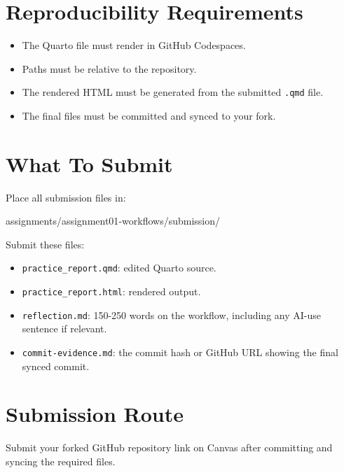 \documentclass[
  letterpaper,
  DIV=11,
  numbers=noendperiod,
  oneside]{scrreprt}
\newenvironment{Shaded}{\begin{snugshade}}{\end{snugshade}}
\newcommand{\NormalTok}[1]{\textcolor[rgb]{0.00,0.23,0.31}{#1}}
\providecommand{\tightlist}{%
  \setlength{\itemsep}{0pt}\setlength{\parskip}{0pt}}
\begin{document}
\section{Reproducibility
Requirements}\label{reproducibility-requirements}

\begin{itemize}
\tightlist
\item
  The Quarto file must render in GitHub Codespaces.
\item
  Paths must be relative to the repository.
\item
  The rendered HTML must be generated from the submitted \texttt{.qmd}
  file.
\item
  The final files must be committed and synced to your fork.
\end{itemize}

\section{What To Submit}\label{what-to-submit}

Place all submission files in:

\begin{Shaded}
\begin{Highlighting}[numbers=left,,]
\NormalTok{assignments/assignment01{-}workflows/submission/}
\end{Highlighting}
\end{Shaded}

Submit these files:

\begin{itemize}
\tightlist
\item
  \texttt{practice\_report.qmd}: edited Quarto source.
\item
  \texttt{practice\_report.html}: rendered output.
\item
  \texttt{reflection.md}: 150-250 words on the workflow, including any
  AI-use sentence if relevant.
\item
  \texttt{commit-evidence.md}: the commit hash or GitHub URL showing the
  final synced commit.
\end{itemize}

\section{Submission Route}\label{submission-route}

Submit your forked GitHub repository link on Canvas after committing and
syncing the required files.
\end{document}
